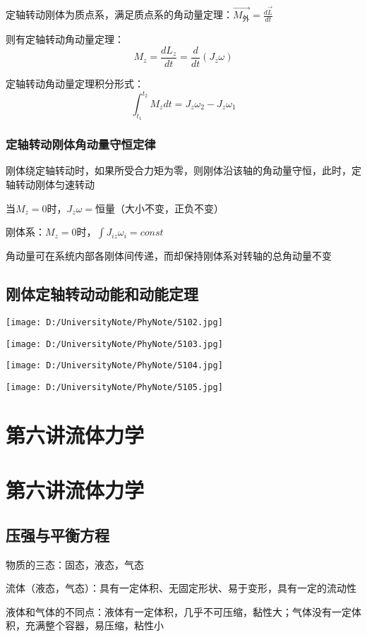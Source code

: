 \documentclass[UTF8]{article}
\begin{document}
    定轴转动刚体为质点系，满足质点系的角动量定理：$\vec{M_{\mbox{外}}} = \frac{d\vec{L}}{dt}$

    则有定轴转动角动量定理：\[M_z = \frac{dL_z}{dt} = \frac{d}{dt}(J_z\omega)\]

    定轴转动角动量定理积分形式：\[\int_{t_1}^{t_2}M_zdt = J_z\omega_2 - J_z\omega_1\]

\subsubsection{定轴转动刚体角动量守恒定律}

    刚体绕定轴转动时，如果所受合力矩为零，则刚体沿该轴的角动量守恒，此时，定轴转动刚体匀速转动

    当$M_z = 0$时，$J_z\omega=$恒量（大小不变，正负不变）

    刚体系：$M_z = 0$时，$\int J_{iz}\omega_i = const$

    角动量可在系统内部各刚体间传递，而却保持刚体系对转轴的总角动量不变

\subsection{刚体定轴转动动能和动能定理}

\texttt{[image: D:/UniversityNote/PhyNote/5102.jpg]}

\texttt{[image: D:/UniversityNote/PhyNote/5103.jpg]}

\texttt{[image: D:/UniversityNote/PhyNote/5104.jpg]}

\texttt{[image: D:/UniversityNote/PhyNote/5105.jpg]}
\newpage
\section{第六讲\;\;流体力学}
\section{第六讲\;\;流体力学}
\subsection{压强与平衡方程}

    物质的三态：固态，液态，气态

    流体（液态，气态）：具有一定体积、无固定形状、易于变形，具有一定的流动性

    液体和气体的不同点：液体有一定体积，几乎不可压缩，黏性大；气体没有一定体积，充满整个容器，易压缩，粘性小
\end{document}
